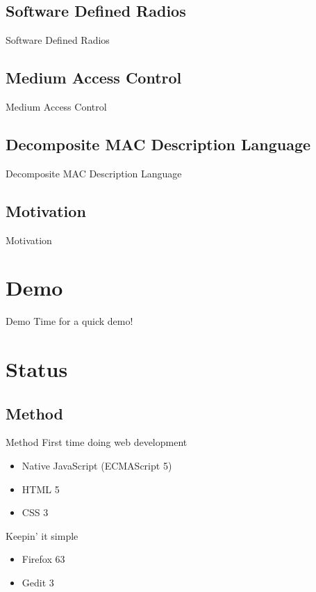 \documentclass{beamer}
\begin{document}
\subsection{Software Defined Radios}
\begin{frame}{Software Defined Radios}
\end{frame}

\subsection{Medium Access Control}
\begin{frame}{Medium Access Control}
\end{frame}

\subsection{Decomposite MAC Description Language}
\begin{frame}{Decomposite MAC Description Language}
\end{frame}

\subsection{Motivation}
\begin{frame}{Motivation}
\end{frame}

\section{Demo}
\begin{frame}{Demo}
Time for a quick demo!
\end{frame}

\section{Status}
\subsection{Method}
\begin{frame}{Method}
	First time doing web development
	\begin{itemize}
		\item Native JavaScript (ECMAScript 5)
		\item HTML 5
		\item CSS 3
	\end{itemize}
	Keepin' it simple
	\begin{itemize}
		\item Firefox 63
		\item Gedit 3
	\end{itemize}
\end{frame}
\end{document}
